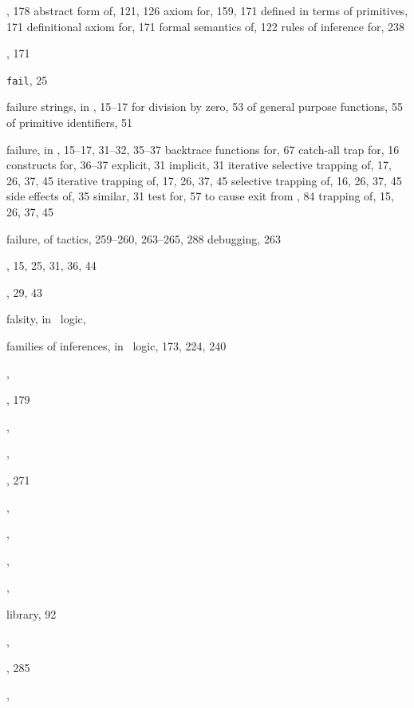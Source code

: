 \begin{theindex}
  \item {}, 178
    \subitem abstract form of, 121, 126
    \subitem axiom for, 159, 171
    \subitem defined in terms of primitives, 171
    \subitem definitional axiom for, 171
    \subitem formal semantics of, 122
    \subitem rules of inference for, 238
  \item {}, 171
  \item {\small\verb+fail+}, 25
  \item failure strings, in \ML, 15--17
    \subitem for division by zero, 53
    \subitem of general purpose functions, 55
    \subitem of primitive identifiers, 51
  \item failure, in \ML, 15--17, 31--32, 35--37
    \subitem backtrace functions for, 67
    \subitem catch-all trap for, 16
    \subitem constructs for, 36--37
    \subitem explicit, 31
    \subitem implicit, 31
    \subitem iterative selective trapping of, 17, 26, 37, 45
    \subitem iterative trapping of, 17, 26, 37, 45
    \subitem selective trapping of, 16, 26, 37, 45
    \subitem side effects of, 35
    \subitem similar, 31
    \subitem test for, 57
    \subitem to cause exit from \HOL, 84
    \subitem trapping of, 15, 26, 37, 45
  \item failure, of tactics, 259--260, 263--265, 288
    \subitem debugging, 263
  \item {}, 15, 25, 31, 36, 44
  \item {}, 29, 43
  \item falsity, in \HOL\ logic, 
  \item families of inferences, in \HOL\ logic, 173, 224, 240
  \item {}, 
  \item {}, 179
  \item {}, 
  \item {}, 
  \item {}, 271
  \item {}, 
  \item {}, 
  \item {}, 
  \item {}, 
  \item {} library, 92
  \item {}, 
  \item {}, 285
  \item {}, 

\end{theindex}

